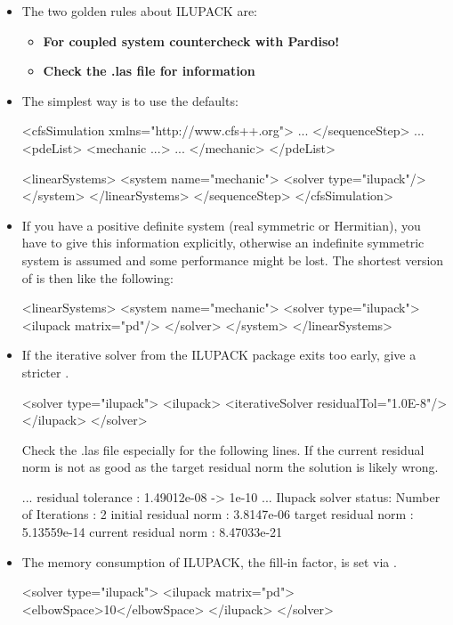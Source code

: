 \begin{itemize}
\item
The two golden rules about ILUPACK are:
\begin{itemize}
\item \textbf{For coupled system countercheck with Pardiso!}
\item \textbf{Check the .las file for information}
\end{itemize}

\item The simplest way is to use the defaults:
\begin{xmllisting}
<cfsSimulation xmlns="http://www.cfs++.org">
  ...
 </sequenceStep>
 ...
  <pdeList>
    <mechanic ...>
        ...
    </mechanic>
  </pdeList>
  
  <linearSystems>
    <system name="mechanic">
       <solver type="ilupack"/>
    </system>
  </linearSystems>
 </sequenceStep>
</cfsSimulation>
\end{xmllisting}

\item If you have a positive definite system (real symmetric or Hermitian), you
have to give this information explicitly, otherwise an indefinite symmetric
system is assumed and some performance might be lost. The shortest version of
 is then like the following:
\begin{xmllisting}
<linearSystems>
  <system name="mechanic">
     <solver type="ilupack">
        <ilupack matrix="pd"/>
     </solver>
  </system>
</linearSystems>
\end{xmllisting}
\item If the iterative solver from the ILUPACK package exits too early, give a
stricter . 
\begin{xmllisting}
<solver type="ilupack">
   <ilupack>
      <iterativeSolver residualTol="1.0E-8"/>
   </ilupack>
</solver>
\end{xmllisting}
Check the .las file especially for the following lines. If the current residual
norm is not as good as the target residual norm the solution is likely wrong.
\begin{xmllisting}
...
residual tolerance      : 1.49012e-08 -> 1e-10
...
Ilupack solver status:
 Number of Iterations    : 2
 initial residual norm   : 3.8147e-06
 target residual norm    : 5.13559e-14
 current residual norm   : 8.47033e-21
\end{xmllisting}
\item The memory consumption of ILUPACK, the fill-in factor, is set via
.
\begin{xmllisting}
<solver type="ilupack">
   <ilupack matrix="pd">
      <elbowSpace>10</elbowSpace>
   </ilupack>
</solver>
\end{xmllisting}
\end{itemize}

